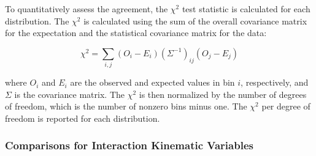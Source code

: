 To quantitatively assess the agreement, the $\chi^2$ test statistic is calculated for each distribution. The $\chi^2$ is calculated using the sum of the overall covariance matrix for the expectation and the statistical covariance matrix for the data:

\begin{equation}
    \chi^2 = \sum_{i,j} \left( O_i - E_i \right) \left( \Sigma^{-1} \right)_{ij} \left( O_j - E_j \right)
\end{equation}

\noindent
where $O_i$ and $E_i$ are the observed and expected values in bin $i$, respectively, and $\Sigma$ is the covariance matrix. The $\chi^2$ is then normalized by the number of degrees of freedom, which is the number of nonzero bins minus one. The $\chi^2$ per degree of freedom is reported for each distribution.

\subsubsection{Comparisons for Interaction Kinematic Variables}
\label{sec:datamc_interaction_kinematic_variables}

